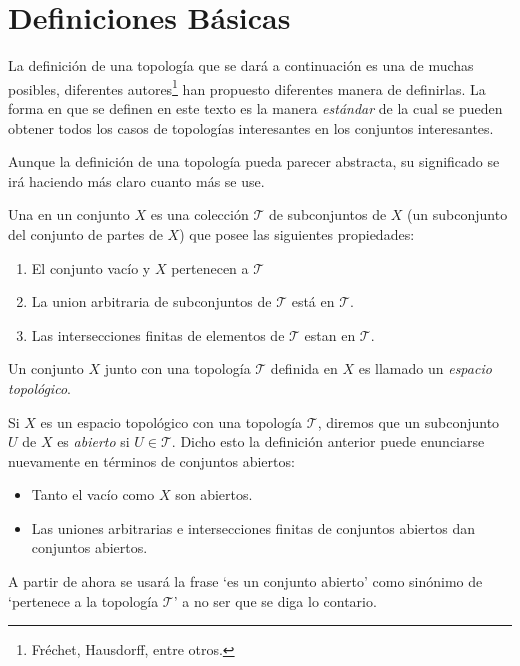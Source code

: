 \chapter{Definiciones Básicas}%
\label{cha:definiciones_básicas}

La definición de una topología que se dará a
continuación es una de muchas posibles, diferentes
autores\footnote{Fréchet, Hausdorff, entre otros.} han
propuesto diferentes manera de definirlas. La forma en
que se definen en este texto es la manera
\emph{estándar} de la cual se pueden obtener todos los
casos de topologías interesantes en los conjuntos
interesantes.

Aunque la definición de una topología pueda parecer
abstracta, su significado se irá haciendo más claro
cuanto más se use.

\begin{defi} Una  en un conjunto $X$ es
	una colección $\mathcal{T}$ de subconjuntos de
	$X$ (un subconjunto del conjunto de partes de
	$X$) que posee las siguientes propiedades:
	\begin{enumerate} \item El conjunto vacío y $X$
		pertenecen a $ \mathcal{T}$
	\item La
		union arbitraria de subconjuntos de $
		\mathcal{T} $ está en $ \mathcal{T} $.
	\item Las intersecciones finitas de elementos
		de $ \mathcal{T} $ estan en $
		\mathcal{T} $.  \end{enumerate} 
	Un
	conjunto $ X $ junto con una topología $
\mathcal{T} $ definida en $ X $ es llamado un
\emph{espacio topológico}.  \end{defi}

Si $ X $ es un espacio topológico con una topología $
\mathcal{T} $, diremos que un subconjunto $ U $ de $ X
$ es \emph{abierto} si $ U\in \mathcal{T} $. Dicho esto
la definición anterior puede enunciarse nuevamente en
términos de conjuntos abiertos: 
\begin{itemize} \item
	Tanto el vacío como $ X $ son abiertos.  
	\item
	Las uniones arbitrarias e intersecciones
	finitas de conjuntos abiertos dan conjuntos
	abiertos.  \end{itemize}

A partir de ahora se usará la frase `es un conjunto
abierto' como sinónimo de `pertenece a la topología $
\mathcal{T} $' a no ser que se diga lo contario.

